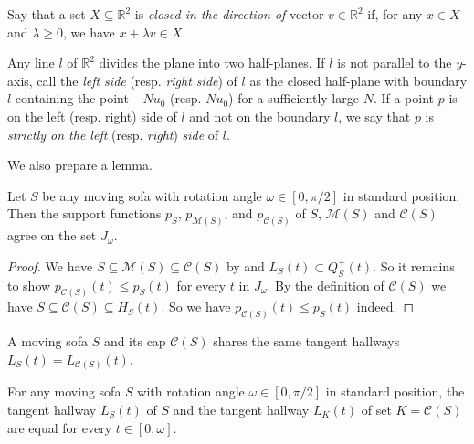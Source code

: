 \begin{definition}

Say that a set \(X \subseteq \mathbb{R}^2\) is \emph{closed in the direction of} vector \(v \in \mathbb{R}^2\) if, for any \(x \in X\) and \(\lambda \geq 0\), we have \(x + \lambda v \in X\).

\label{def:closed-in-direction}
\end{definition}

\begin{definition}

Any line \(l\) of \(\mathbb{R}^2\) divides the plane into two half-planes. If \(l\) is not parallel to the \(y\)-axis, call the \emph{left side} (resp. \emph{right side}) of \(l\) as the closed half-plane with boundary \(l\) containing the point \(- Nu_0\) (resp. \(Nu_0\)) for a sufficiently large \(N\). If a point \(p\) is on the left (resp. right) side of \(l\) and not on the boundary \(l\), we say that \(p\) is \emph{strictly on the left} (resp. \emph{right}) \emph{side} of \(l\).

\label{def:line-half-plane-directions}
\end{definition}

We also prepare a lemma.

\begin{lemma}

Let \(S\) be any moving sofa with rotation angle \(\omega \in [0, \pi/2]\) in standard position. Then the support functions \(p_S\), \(p_{\mathcal{M}(S)}\), and \(p_{\mathcal{C}(S)}\) of \(S\), \(\mathcal{M}(S)\) and \(\mathcal{C}(S)\) agree on the set \(J_\omega\).

\label{lem:cap-same-support-function}
\end{lemma}

\begin{proof}
We have \(S \subseteq \mathcal{M}(S) \subseteq \mathcal{C}(S)\) by  and \(L_S(t) \subset Q_S^+(t)\). So it remains to show \(p_{\mathcal{C}(S)}(t) \leq p_S(t)\) for every \(t\) in \(J_\omega\). By the definition of \(\mathcal{C}(S)\) we have \(S \subseteq \mathcal{C}(S) \subseteq H_S(t)\). So we have \(p_{\mathcal{C}(S)}(t) \leq p_S(t)\) indeed.
\end{proof}

A moving sofa \(S\) and its cap \(\mathcal{C}(S)\) shares the same tangent hallways \(L_S(t) = L_{\mathcal{C}(S)}(t)\).

\begin{proposition}

For any moving sofa \(S\) with rotation angle \(\omega \in [0, \pi/2]\) in standard position, the tangent hallway \(L_S(t)\) of \(S\) and the tangent hallway \(L_K(t)\) of set \(K = \mathcal{C}(S)\) are equal for every \(t \in [0, \omega]\).

\label{pro:cap-same-tangent-hallway}
\end{proposition}

